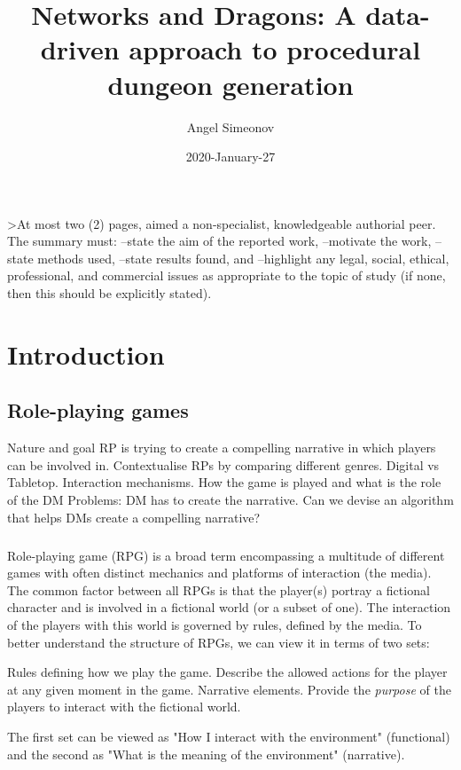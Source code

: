\documentclass{UoYCSproject}
\author{Angel Simeonov}
\title{Networks and Dragons: A data-driven approach to procedural dungeon generation}
\date{2020-January-27}
\begin{document}
\maketitle
\listoffigures
\listoftables

\begin{summary}
>At most two (2) pages, aimed a non-specialist, knowledgeable authorial peer.
The summary must:
--state the aim of the reported work,
--motivate the work,
--state methods used,
--state results found, and
--highlight any legal, social, ethical, professional, and commercial issues as appropriate to the topic of study (if none, then this should be explicitly stated).
\end{summary}

\chapter{Introduction}
\label{cha:Introduction}

\section{Role-playing games}
\begin{outline}
  \1 Nature and goal  RP is trying to create a compelling narrative in which players can be involved in.
    \2 Contextualise RPs by comparing different genres. Digital vs Tabletop.
  \1 Interaction mechanisms. How the game is played and what is the role of the DM
  \1 Problems: DM has to create the narrative. Can we devise an algorithm that helps DMs create a compelling narrative?
\end{outline}

\paragraph{}
Role-playing game (RPG) is a broad term encompassing a multitude of different games with often distinct mechanics and platforms of interaction (the media). The common factor between all RPGs is that the player(s) portray a fictional character and is involved in a fictional world (or a subset of one). The interaction of the players with this world is governed by rules, defined by the media. To better understand the structure of RPGs, we can view it in terms of two sets: 
\begin{outline}[enumerate]
  \1 Rules defining how we play the game. Describe the allowed actions for the player at any given moment in the game.
  \1 Narrative elements. Provide the \textit{purpose} of the players to interact with the fictional world. 
\end{outline}
The first set can be viewed as "How I interact with the environment" (functional) and the second as "What is the meaning of the environment" (narrative).
\end{document}
